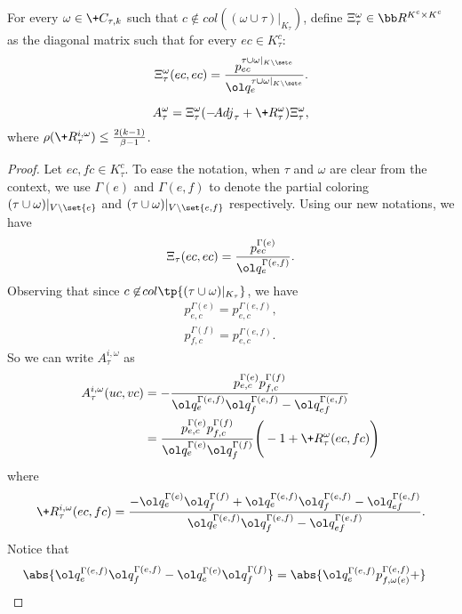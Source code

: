 \documentclass[a4paper,11pt]{article}
\begin{document}
For every $\omega\in\+C_{\tau,k}$ such that $c\not\in \!{col}((\omega\cup\tau)|_{K_\tau})$,
define $\Xi_\tau^{\omega} \in \bb R^{K^c\times K^c}$ as the diagonal matrix such that for every $ec \in K_\tau^{c}$:
\[
	\Xi_\tau^{\omega}(ec,ec) =
    \frac{p^{\tau\cup\omega|_{K\setminus \set e}}_{ec}}
         {\ol q^{\tau\cup\omega|_{K\setminus \set e}}_e}.
\]
\begin{lemma}\label{lem:A-tau-i-omega}
	\[
	A_\tau^{\omega} = \Xi_\tau^{\omega} (-\!{Adj}_\tau + \+R_\tau^{\omega}) \Xi_{\tau}^{\omega} ,
	\]
	where $\rho(\+R_\tau^{i,\omega}) \le  \frac{2(k-1)}{\beta - 1}$.
\end{lemma}
\begin{proof}
	Let $ec,fc\in K_\tau^{c}$.
    To ease the notation, when $\tau$ and $\omega$ are clear from the context,
    we use $\Gamma(e)$ and $\Gamma(e,f)$ to denote the partial coloring $(\tau\cup\omega)|_{V\setminus\set{e}}$ and $(\tau\cup\omega)|_{V\setminus\set{e,f}}$ respectively.
	Using our new notations, we have
	\[
	\Xi_\tau(ec,ec) =
    \frac{p^{\Gamma(e)}_{ec}}
         {\ol q^{\Gamma(e, f)}_e}.
	\]
	Observing that since $c\not\in\!{col}\tp{(\tau\cup \omega)|_{K_\tau}}$, we have
	\begin{align*}
        p^{\Gamma(e)}_{e, c} = p^{\Gamma(e, f)}_{e, c},
      \\p^{\Gamma(f)}_{f, c} = p^{\Gamma(e, f)}_{e, c}.
	\end{align*}
	So we can write $A_\tau^{i,\omega}$ as
	\begin{align*}
		A_\tau^{i,\omega}(uc,vc)
		&=-\frac{p^{\Gamma(e)}_{e, c}p^{\Gamma(f)}_{f, c}}
        {\ol q^{\Gamma(e,f)}_e \ol q^{\Gamma(e,f)}_f - \ol q^{\Gamma(e,f)}_{ef}}
	  \\&=\frac{p^{\Gamma(e)}_{e, c}p^{\Gamma(f)}_{f, c}}
        {\ol q^{\Gamma(e)}_e \ol q^{\Gamma(f)}_f}
        \Bigg(
        -1 + \+R_\tau^{\omega}(ec,fc) 
        \Bigg)
	\end{align*}
	where 
	\begin{equation}\label{eqn:eta-remain}
		\+R_\tau^{i,\omega}(ec,fc) =
        \frac{
        -{\ol q^{\Gamma(e)}_e \ol q^{\Gamma(f)}_f}
        +
        {\ol q^{\Gamma(e,f)}_e \ol q^{\Gamma(e,f)}_f - \ol q^{\Gamma(e,f)}_{ef}}
        }{
        {\ol q^{\Gamma(e,f)}_e \ol q^{\Gamma(e,f)}_f - \ol q^{\Gamma(e,f)}_{ef}}
        }.
	\end{equation}
    Notice that
    \begin{align*}
    \abs{\ol q^{\Gamma(e,f)}_e \ol q^{\Gamma(e,f)}_f - \ol q^{\Gamma(e)}_e \ol q^{\Gamma(f)}_f}
    &=
    \abs{\ol q^{\Gamma(e,f)}_e p^{\Gamma(e, f)}_{f, \omega(e)} +
}
\end{align*}
\end{proof}
\end{document}
